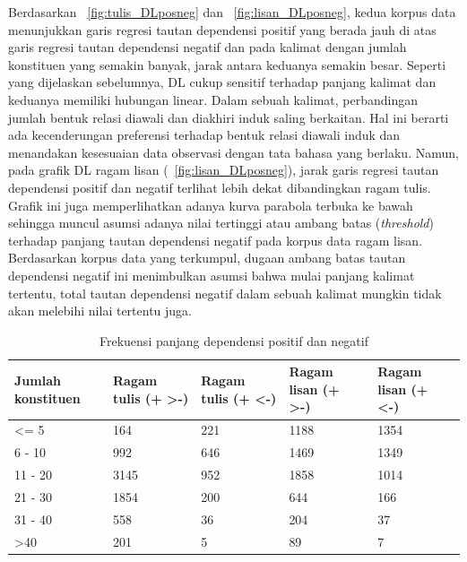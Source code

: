 Berdasarkan \pic~\ref{fig:tulis_DLposneg} dan \pic~\ref{fig:lisan_DLposneg}, kedua korpus data menunjukkan garis regresi tautan dependensi positif yang berada jauh di atas garis regresi tautan dependensi negatif dan pada kalimat dengan jumlah konstituen yang semakin banyak, jarak antara keduanya semakin besar. Seperti yang dijelaskan sebelumnya, DL cukup sensitif terhadap panjang kalimat dan keduanya memiliki hubungan linear. Dalam sebuah kalimat, perbandingan jumlah bentuk relasi diawali dan diakhiri induk saling berkaitan. Hal ini berarti ada kecenderungan preferensi terhadap bentuk relasi diawali induk dan menandakan kesesuaian data observasi dengan tata bahasa yang berlaku. Namun, pada grafik DL ragam lisan (\pic~\ref{fig:lisan_DLposneg}), jarak garis regresi tautan dependensi positif dan negatif terlihat lebih dekat dibandingkan ragam tulis. Grafik ini juga memperlihatkan adanya kurva parabola terbuka ke bawah sehingga muncul asumsi adanya nilai tertinggi atau ambang batas (\textit{threshold}) terhadap panjang tautan dependensi negatif pada korpus data ragam lisan. Berdasarkan korpus data yang terkumpul, dugaan ambang batas tautan dependensi negatif ini menimbulkan asumsi bahwa mulai panjang kalimat tertentu, total tautan dependensi negatif dalam sebuah kalimat mungkin tidak akan melebihi nilai tertentu juga. 

\begin{table}
\begin{center}
\begin{small}
\caption{Frekuensi panjang dependensi positif dan negatif}  \label{tab:DLposneg}
\begin{tabular}{ | p{2cm} | p{2cm} | p{2cm} | p{2cm} | p{2cm} |}
\hline
Jumlah konstituen & Ragam tulis (+ \textgreater -) & Ragam tulis (+ \textless -) & Ragam lisan (+ \textgreater -) & Ragam lisan (+ \textless -) \\ \hline
\textless= 5 & 164 & 221 & 1188 & 1354 \\ \hline
6 - 10 & 992 & 646 &1469 & 1349 \\ \hline
11 - 20 & 3145 & 952 & 1858 & 1014 \\ \hline
21 - 30 & 1854 & 200 & 644 & 166 \\ \hline
31 - 40 & 558 & 36 & 204 & 37 \\ \hline
\textgreater 40 & 201 & 5 & 89 & 7 \\ \hline
 \end{tabular}
 \end{small}
 \end{center}
 \end{table}
 

